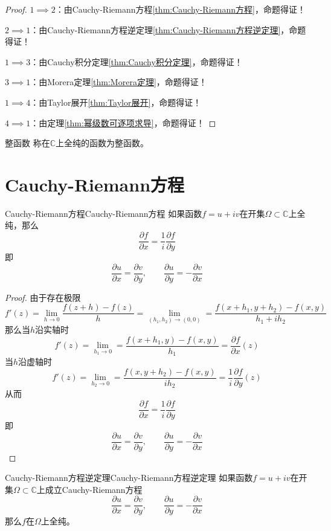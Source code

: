 \documentclass[lang = cn, scheme = chinese, thmcnt = section]{elegantbook}
\newcommand{\C}{\mathbb{C}}  		   %
\newcommand{\sub}{\subset}             %
\begin{document}
\begin{proof}
	$1\implies 2$：由Cauchy-Riemann方程\ref{thm:Cauchy-Riemann方程}，命题得证！
	
	$2\implies 1$：由Cauchy-Riemann方程逆定理\ref{thm:Cauchy-Riemann方程逆定理}，命题得证！
	
	$1\implies 3$：由Cauchy积分定理\ref{thm:Cauchy积分定理}，命题得证！
	
	$3\implies 1$：由Morera定理\ref{thm:Morera定理}，命题得证！
	
	$1\implies 4$：由Taylor展开\ref{thm:Taylor展开}，命题得证！
	
	$4\implies 1$：由定理\ref{thm:幂级数可逐项求导}，命题得证！
\end{proof}

\begin{definition}{整函数}
	称在$\C$上全纯的函数为整函数。
\end{definition}

\section{Cauchy-Riemann方程}

\begin{theorem}{Cauchy-Riemann方程}{Cauchy-Riemann方程}
	如果函数$f=u+iv$在开集$\Omega\sub\C$上全纯，那么
	$$
	\frac{\partial f}{\partial x}=\frac{1}{i}\frac{\partial f}{\partial y}
	$$
	即
	$$
	\frac{\partial u}{\partial x}=\frac{\partial v}{\partial y},
	\qquad
	\frac{\partial u}{\partial y}=-\frac{\partial v}{\partial x}
	$$
\end{theorem}

\begin{proof}
	由于存在极限%
	$$
	f'(z)=\lim_{h\to 0}\frac{f(z+h)-f(z)}{h}
	=\lim_{(h_1,h_2)\to (0,0)}=\frac{f(x+h_1,y+h_2)-f(x,y)}{h_1+ih_2}
	$$
	那么当$h$沿实轴时%
	$$
	f'(z)=\lim_{h_1\to 0}=\frac{f(x+h_1,y)-f(x,y)}{h_1}=\frac{\partial f}{\partial x}(z)
	$$
	当$h$沿虚轴时%
	$$
	f'(z)=\lim_{h_2\to 0}=\frac{f(x,y+h_2)-f(x,y)}{ih_2}=\frac{1}{i}\frac{\partial f}{\partial y}(z)
	$$
	从而
	$$
	\frac{\partial f}{\partial x}=\frac{1}{i}\frac{\partial f}{\partial y}
	$$
	即
	$$
	\frac{\partial u}{\partial x}=\frac{\partial v}{\partial y},
	\qquad
	\frac{\partial u}{\partial y}=-\frac{\partial v}{\partial x}
	$$
\end{proof}

\begin{theorem}{Cauchy-Riemann方程逆定理}{Cauchy-Riemann方程逆定理}
	如果函数$f=u+iv$在开集$\Omega\sub\C$上成立Cauchy-Riemann方程
	$$
	\frac{\partial u}{\partial x}=\frac{\partial v}{\partial y},
	\qquad
	\frac{\partial u}{\partial y}=-\frac{\partial v}{\partial x}
	$$
	那么$f$在$\Omega$上全纯。
\end{theorem}
\end{document}
